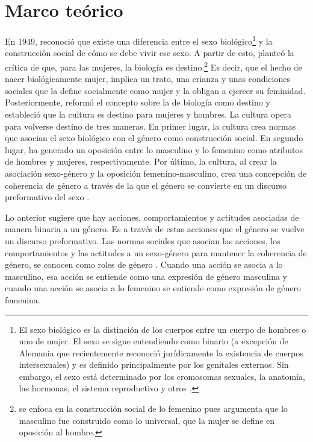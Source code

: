 \section{Marco teórico}
En 1949, \citeauthor{beauviour1949segundosexo} reconoció que existe una diferencia entre el sexo biológico\footnote{El sexo biológico es la distinción de los cuerpos entre un cuerpo de hombres o uno de mujer. El sexo se sigue entendiendo como binario (a excepción de Alemania que recientemente reconoció jurídicamente la existencia de cuerpos intersexuales) y es definido principalmente por los genitales externos. Sin embargo, el sexo está determinado por los cromosomas sexuales, la anatomía, las hormonas, el sistema reproductivo y otros \citep{lindsey2015genderroles}.} y la construcción social de cómo se debe vivir ese sexo. A partir de esto, planteó la crítica de que, para las mujeres, la biología es destino.\footnote{\cite{beauviour1949segundosexo} se enfoca en la construcción social de lo femenino pues argumenta que lo masculino fue construido como lo universal, que la mujer se define en oposición al hombre.} Es decir, que el hecho de nacer biológicamente mujer, implica un trato, una crianza y unas condiciones sociales que la define socialmente como mujer y la obligan a ejercer su feminidad. Posteriormente, \cite{butler2002gendertrouble} reformó el concepto sobre la de biología como destino y estableció que la cultura es destino para mujeres y hombres. La cultura opera para volverse destino de tres maneras. En primer lugar, la cultura crea normas que asocian el sexo biológico con el género como construcción social. En segundo lugar, ha generado un oposición entre lo masculino y lo femenino como atributos de hombres y mujeres, respectivamente. Por último, la cultura, al crear la asociación sexo-género y la oposición femenino-masculino, crea una concepción de coherencia de género a través de la que el género se convierte en un discurso preformativo del sexo \citep{butler2002gendertrouble}.

Lo anterior sugiere que hay acciones, comportamientos y actitudes asociadas de manera binaria a un género. Es a través de estas acciones que el género se vuelve un discurso preformativo. Las normas sociales que asocian las acciones, los comportamientos y las actitudes a un sexo-género para mantener la coherencia de género, se conocen como roles de género \citep{lindsey2015genderroles}. Cuando una acción se asocia a lo masculino, esa acción se entiende como una expresión de género masculina y cuando una acción se asocia a lo femenino se entiende como expresión de género femenina.

